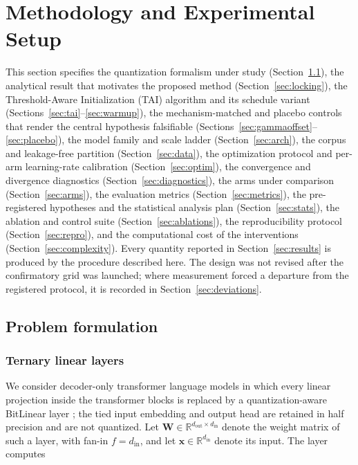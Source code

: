 \documentclass[final,5p,times,twocolumn]{elsarticle}
\theoremstyle{remark}
\newcommand{\R}{\mathbb{R}}
\newcommand{\Wm}{\mathbf{W}}
\newcommand{\xv}{\mathbf{x}}
\begin{document}

\section{Methodology and Experimental Setup}
\label{sec:methods}

This section specifies the quantization formalism under study
(Section~\ref{sec:problem}), the analytical result that motivates the proposed
method (Section~\ref{sec:locking}), the Threshold-Aware Initialization (TAI)
algorithm and its schedule variant (Sections~\ref{sec:tai}--\ref{sec:warmup}),
the mechanism-matched and placebo controls that render the central hypothesis
falsifiable (Sections~\ref{sec:gammaoffset}--\ref{sec:placebo}), the model
family and scale ladder (Section~\ref{sec:arch}), the corpus and leakage-free
partition (Section~\ref{sec:data}), the optimization protocol and per-arm
learning-rate calibration (Section~\ref{sec:optim}), the convergence and
divergence diagnostics (Section~\ref{sec:diagnostics}), the arms under
comparison (Section~\ref{sec:arms}), the evaluation metrics
(Section~\ref{sec:metrics}), the pre-registered hypotheses and the statistical
analysis plan (Section~\ref{sec:stats}), the ablation and control suite
(Section~\ref{sec:ablations}), the reproducibility protocol
(Section~\ref{sec:repro}), and the computational cost of the interventions
(Section~\ref{sec:complexity}). Every quantity reported in
Section~\ref{sec:results} is produced by the procedure described here. The
design was not revised after the confirmatory grid was launched; where
measurement forced a departure from the registered protocol, it is recorded in
Section~\ref{sec:deviations}.

\subsection{Problem formulation}
\label{sec:problem}

\subsubsection{Ternary linear layers}

We consider decoder-only transformer language models in which every linear
projection inside the transformer blocks is replaced by a quantization-aware
BitLinear layer \cite{wang2023}; the tied input embedding and output head are
retained in half precision and are not quantized. Let
$\Wm \in \R^{d_{\mathrm{out}} \times d_{\mathrm{in}}}$ denote the weight matrix
of such a layer, with fan-in $f = d_{\mathrm{in}}$, and let
$\xv \in \R^{d_{\mathrm{in}}}$ denote its input. The layer computes
\end{document}
